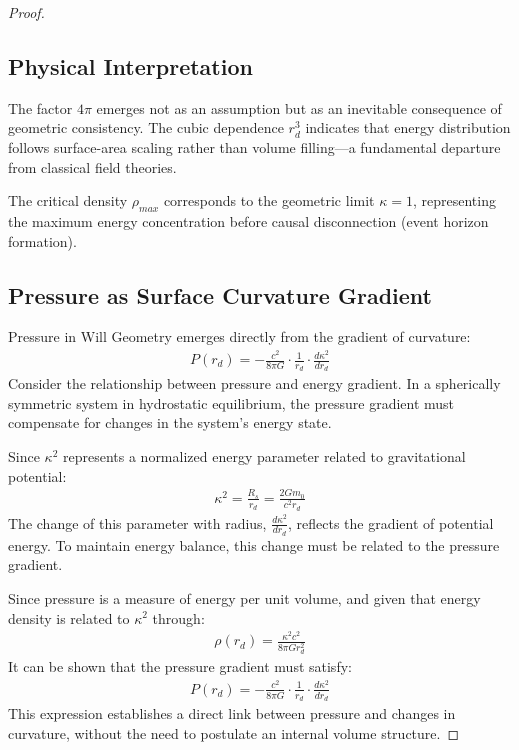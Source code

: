 \documentclass{article}
\begin{document}
\begin{proof}
\subsection{Physical Interpretation}
The factor $4\pi$ emerges not as an assumption but as an inevitable consequence of geometric consistency. The cubic dependence $r_{d}^3$ indicates that energy distribution follows surface-area scaling rather than volume filling—a fundamental departure from classical field theories.

The critical density $\rho_{max}$ corresponds to the geometric limit $\kappa = 1$, representing the maximum energy concentration before causal disconnection (event horizon formation).


\subsection{Pressure as Surface Curvature Gradient}

Pressure in Will Geometry emerges directly from the gradient of curvature:
\begin{align}
P(r_{d}) = - \frac{c^2}{8\pi G} \cdot \frac{1}{r_{d}} \cdot \frac{d\kappa^2}{dr_{d}}
\end{align}
Consider the relationship between pressure and energy gradient. In a spherically symmetric system in hydrostatic equilibrium, the pressure gradient must compensate for changes in the system's energy state.

Since $\kappa^2$ represents a normalized energy parameter related to gravitational potential:
\begin{align}
\kappa^2 = \frac{R_s}{r_{d}} = \frac{2Gm_0}{c^2r_{d}}
\end{align}
The change of this parameter with radius, $\frac{d\kappa^2}{dr_{d}}$, reflects the gradient of potential energy. To maintain energy balance, this change must be related to the pressure gradient.

Since pressure is a measure of energy per unit volume, and given that energy density is related to $\kappa^2$ through:
\begin{align}
\rho(r_{d}) = \frac{\kappa^2 c^2}{8\pi G r_{d}^2}
\end{align}
It can be shown that the pressure gradient must satisfy:
\begin{align}
P(r_{d}) = - \frac{c^2}{8\pi G} \cdot \frac{1}{r_{d}} \cdot \frac{d\kappa^2}{dr_{d}}
\end{align}
This expression establishes a direct link between pressure and changes in curvature, without the need to postulate an internal volume structure.


\end{proof}
\end{document}
